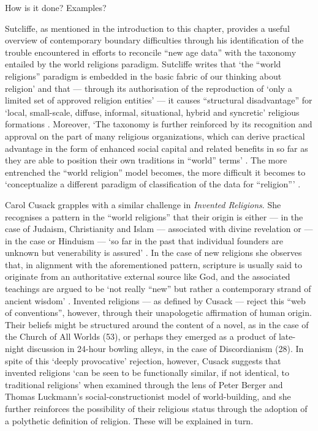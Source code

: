 How is it done? Examples?

Sutcliffe, as mentioned in the introduction to this chapter,
provides a useful overview of contemporary boundary difficulties through his
identification of the trouble encountered in efforts to reconcile
``new age data'' with the taxonomy entailed by the world religions paradigm.
Sutcliffe writes that `the ``world religions'' paradigm is embedded in the
basic fabric of our thinking about religion' and that --- through its
authorisation of the reproduction of `only a limited set
of approved religion entities' --- it causes ``structural disadvantage'' for
`local, small-scale, diffuse, informal, situational, hybrid and syncretic'
religious formations \parencite[22, 25]{Sutcliffe14}.
Moreover, `The taxonomy is further reinforced by
its recognition and approval on the part of many religious organizations,
which can derive practical advantage in the form of enhanced social capital
and related benefits in so far as they are able to position
their own traditions in ``world'' terms' \parencite[23]{Sutcliffe14}.
The more entrenched the ``world religion'' model becomes,
the more difficult it becomes to `conceptualize a different paradigm
of classification of the data for ``religion''\thinspace'
\parencite[25]{Sutcliffe14}.

Carol Cusack grapples with a similar challenge in \textit{Invented Religions}.
She recognises a pattern in the ``world religions'' that their origin is
either --- in the case of Judaism, Christianity and Islam ---
associated with divine revelation or --- in the case or Hinduism ---
`so far in the past that individual founders are unknown but venerability is
assured' \parencite[1]{Cusack10}.
In the case of new religions she observes that, in alignment with the
aforementioned pattern, scripture is usually said to originate from
an authoritative external source like God, and the associated teachings
are argued to be `not really ``new'' but rather a contemporary
strand of ancient wisdom' \parencite[1]{Cusack10}.
Invented religions --- as defined by Cusack --- reject this
``web of conventions'', however, through their unapologetic affirmation of
human origin.
Their beliefs might be structured around the content of a novel,
as in the case of the Church of All Worlds (53),
or perhaps they emerged as a product of late-night discussion in
24-hour bowling alleys, in the case of Discordianism (28).
In spite of this `deeply provocative' rejection,
however, Cusack suggests that invented religions `can be seen to be
functionally similar, if not identical, to traditional religions'
when examined through the lens of Peter Berger and Thomas Luckmann's
social-constructionist model of world-building, and she further reinforces
the possibility of their religious status through the adoption of a polythetic
definition of religion. These will be explained in turn.

